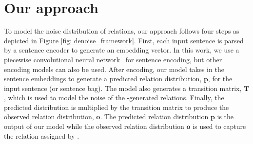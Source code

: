 \section{Our approach}
%

To model the noise distribution of relations, our approach follows four steps as depicted in Figure \ref{fig: denoise_framework}.
First, each input sentence is parsed by a sentence encoder to generate an embedding vector. In this work, we
use a piecewise convolutional neural network~\cite{zeng2015distant} for sentence encoding, but other encoding models can also be
used. After encoding, our model takes in the sentence embeddings to generate a predicted relation
distribution, $\mathbf{p}$, for the input sentence (or sentence bag). The model also generates a transition matrix,
$\mathbf{T}$, which is used to model the noise of the \DS-generated relations. Finally, the predicted distribution is
multiplied by the transition matrix to produce the observed relation distribution, $\mathbf{o}$. The predicted
relation distribution $\mathbf{p}$ is the output of our model while the observed relation distribution $\mathbf{o}$ is
used to capture the relation assigned by \DS. 


